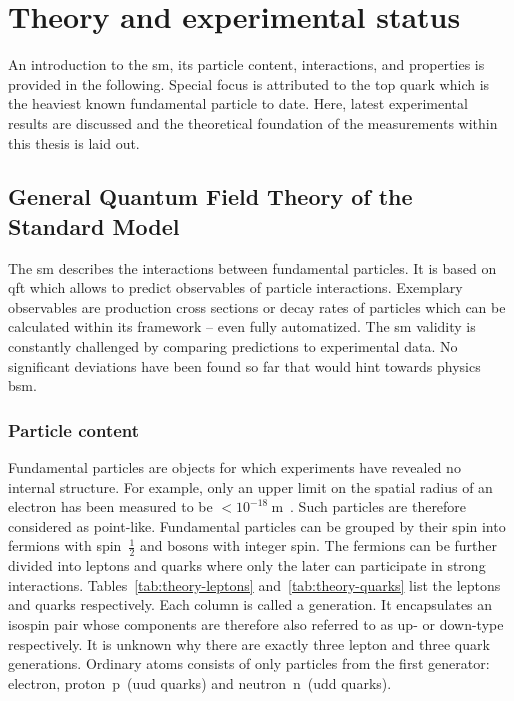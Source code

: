 \chapter{Theory and experimental status}

An introduction to the \gls{sm}, its particle content, interactions, and properties is provided in the following. Special focus is attributed to the top quark which is the heaviest known fundamental particle to date. Here, latest experimental results are discussed and the theoretical foundation of the measurements within this thesis is laid out.


\section{General Quantum Field Theory of the Standard Model}

The \gls{sm} describes the interactions between fundamental particles. It is based on \gls{qft} which allows to predict observables of particle interactions. Exemplary observables are production cross sections or decay rates of particles which can be calculated within its framework -- even fully automatized. The \gls{sm} validity is constantly challenged by comparing predictions to experimental data. No significant deviations have been found so far that would hint towards physics \gls{bsm}.


\subsection{Particle content}

Fundamental particles are objects for which experiments have revealed no internal structure. For example, only an upper limit on the spatial radius of an electron has been measured to be $<10^{-18}~\mathrm{m}$~\cite{PhysRevLett.97.030801}. Such particles are therefore considered as point-like. Fundamental particles can be grouped by their spin into fermions with spin~$\frac{1}{2}$ and bosons with integer spin. The fermions can be further divided into leptons and quarks where only the later can participate in strong interactions. Tables~\ref{tab:theory-leptons} and~\ref{tab:theory-quarks} list the leptons and quarks respectively. Each column is called a generation. It encapsulates an isospin pair whose components are therefore also referred to as up- or down-type respectively. It is unknown why there are exactly three lepton and three quark generations. Ordinary atoms consists of only particles from the first generator: electron, proton~p~(uud quarks) and neutron~n~(udd quarks).

